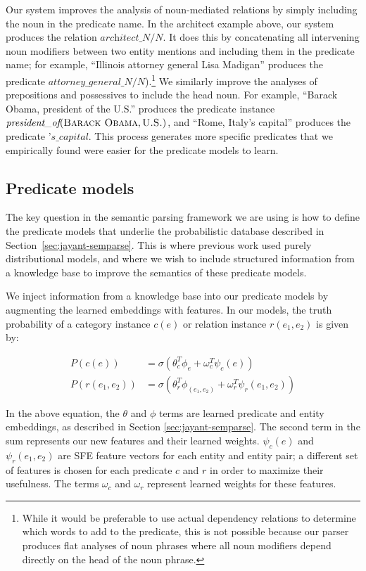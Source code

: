 \documentclass[11pt]{article}
\newcommand{\secref}[1]{Section~\ref{sec:#1}}
\newcommand{\lexicalpredicate}[1]{\ensuremath{\textit{#1}}}
\newcommand{\entity}[1]{\ensuremath{\textsc{#1}}}
\begin{document}
Our system improves the analysis of noun-mediated relations by simply including
the noun in the predicate name. In the architect example above, our system
produces the relation \lexicalpredicate{architect\_N/N}. It does this by
concatenating all intervening noun modifiers between two entity mentions and
including them in the predicate name; for example, ``Illinois attorney general
Lisa Madigan'' produces the predicate
\lexicalpredicate{attorney\_general\_N/N}).\footnote{While it would be
preferable to use actual dependency relations to determine which words to add
to the predicate, this is not possible because our parser produces flat
analyses of noun phrases where all noun modifiers depend directly on the head
of the noun phrase.} We similarly improve the analyses of prepositions and
possessives to include the head noun. For example, ``Barack Obama, president of
the U.S.'' produces the predicate instance
$\lexicalpredicate{president\_of}(\entity{Barack Obama}, \entity{U.S.})$, and
``Rome, Italy's capital'' produces the predicate
\lexicalpredicate{'s\_capital}. This process generates more specific predicates
that we empirically found were easier for the predicate models to learn.

\subsection{Predicate models}
\label{sec:formal-and-distributional}

The key question in the semantic parsing framework we are using is how to
define the predicate models that underlie the probabilistic database described
in \secref{jayant-semparse}.  This is where previous work used purely
distributional models, and where we wish to include structured information from
a knowledge base to improve the semantics of these predicate models.

We inject information from a knowledge base into our predicate models by
augmenting the learned embeddings with features. In our models, the truth
probability of a category instance $c(e)$ or relation instance $r(e_1, e_2)$ is
given by:

\begin{align*}
  P(c(e)) &= \sigma ( \theta_c^T \phi_e + \omega_c^T \psi_c(e)) \\
  P(r(e_1, e_2)) &= \sigma ( \theta_r^T \phi_{(e_1, e_2)} + \omega_r^T \psi_r(e_1, e_2) )
\end{align*}

In the above equation, the $\theta$ and $\phi$ terms are learned predicate and
entity embeddings, as described in Section \ref{sec:jayant-semparse}. The
second term in the sum represents our new features and their learned weights.
$\psi_c(e)$ and $\psi_r(e_1, e_2)$ are SFE feature vectors for each entity and
entity pair; a different set of features is chosen for each predicate $c$ and
$r$ in order to maximize their usefulness. The terms $\omega_c$ and $\omega_r$
represent learned weights for these features.
\end{document}
